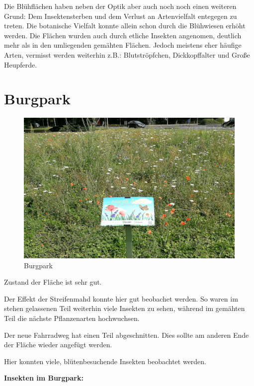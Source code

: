 \documentclass[11pt]{article}
\begin{document}
Die Blühflächen haben neben der Optik aber auch noch noch einen weiteren Grund: Dem Insektensterben und dem Verlust an Artenvielfalt entegegen zu treten. Die botanische Vielfalt konnte allein schon durch die Blühwiesen erhöht werden. Die Flächen wurden auch durch etliche Insekten angenomen, deutlich mehr als in den umliegenden gemähten Flächen. Jedoch meistens eher häufige Arten, vermisst werden weiterhin z.B.: Blutströpfchen, Dickkopffalter und Große Heupferde.


\newpage

\section{Burgpark}

\begin{figure}[h!]
  \includegraphics[width=\linewidth]{img/infotafeln.jpg}
  \caption{Burgpark}
  \label{fig:boat1}
\end{figure}

\begin{flushleft}
Zustand der Fläche ist sehr gut.

Der Effekt der Streifenmahd konnte hier gut beobachet werden.
So waren im stehen gelassenen Teil weiterhin viele Insekten zu sehen, während im gemähten Teil die nächste Pflanzenarten hochwuchsen.

Der neue Fahrradweg hat einen Teil abgeschnitten. 
Dies sollte am anderen Ende der Fläche wieder angefügt werden.

Hier konnten viele, blütenbesuchende Insekten beobachtet werden.

\end{flushleft}

\newpage
\textbf{Insekten im Burgpark:}
\end{document}
